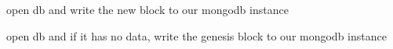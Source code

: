 
\begin{DoxyRefList}
\item[Member \mbox{\hyperlink{class_node_ae1918e440c28994f9fd8343d5bc0c429}{Node\+::handle\+Block}} (\mbox{\hyperlink{class_block}{Block}} block, bool broadcast)]\label{todo__todo000001}%
%
open db and write the new block to our mongodb instance  
\item[Member \mbox{\hyperlink{class_socket_communication_a9d8cebb7b8a9fdc343d63de5e8b78162}{Socket\+Communication\+::start\+P2\+PServer}} (int argc, char $\ast$$\ast$argv)]\label{todo__todo000002}%
%
open db and if it has no data, write the genesis block to our mongodb instance 
\end{DoxyRefList}